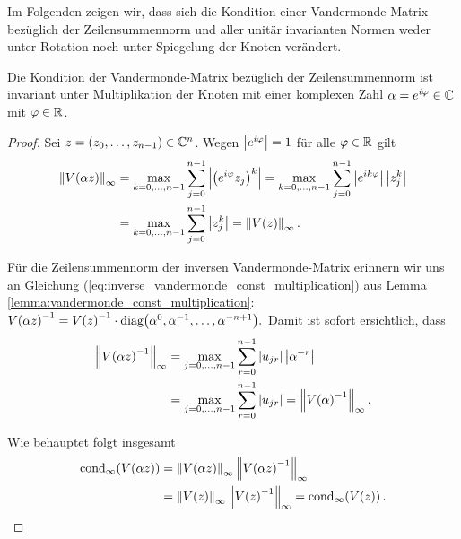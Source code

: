 Im Folgenden zeigen wir, dass sich die Kondition einer Vandermonde-Matrix
bezüglich der Zeilensummennorm und aller unitär invarianten Normen weder unter
Rotation noch unter Spiegelung der Knoten verändert.


\begin{lemma}
    \label{lemma:vandermonde_rotation_invariance}
    Die Kondition der Vandermonde-Matrix bezüglich der Zeilensummennorm ist
    invariant unter Multiplikation der Knoten mit einer komplexen Zahl
    $\alpha = e^{i\varphi} \in \mathbb{C}$ mit $\varphi \in \mathbb{R}$.
\end{lemma}
\begin{proof}
    Sei $z = (z_0, \dots, z_{n-1}) \in \mathbb{C}^n$.
    Wegen $\left\lvert e^{i\varphi} \right\rvert = 1$ für alle $\varphi \in \mathbb{R}$ gilt
    \[
        \begin{split}
            \left\lVert V \! \left( \alpha z \right) \right\rVert_\infty
            &= \max_{k=0, \dots, n-1} \sum_{j=0}^{n-1} \left\lvert \left(e^{i\varphi} z_j\right)^k \right\rvert
            = \max_{k=0, \dots, n-1} \sum_{j=0}^{n-1} \left\lvert e^{ik\varphi} \right\rvert \left\lvert z_j^k \right\rvert\\
            &= \max_{k=0, \dots, n-1} \sum_{j=0}^{n-1} \left\lvert z_j^k \right\rvert
            = \left\lVert V \! \left( z \right) \right\rVert_\infty.
        \end{split}
    \]

    \noindent Für die Zeilensummennorm der inversen Vandermonde-Matrix erinnern
    wir uns an Gleichung
    (\ref{eq:inverse_vandermonde_const_multiplication})
    aus Lemma \ref{lemma:vandermonde_const_multiplication}:
        $V \! \left( \alpha z \right)^{-1}
        = V \! \left( z \right)^{-1} \cdot \text{diag$ \left( \alpha^0, \alpha^{-1}, \dots, \alpha^{-n+1} \right)$}.$
    Damit ist sofort ersichtlich, dass
    \[
        \begin{split}
            \left\lVert V \! \left( \alpha z \right)^{-1} \right\rVert_\infty
            &= \max_{j=0, \dots, n-1} \sum_{r=0}^{n-1} \left\lvert u_{jr} \right\rvert \left\lvert \alpha^{-r} \right\rvert\\
            &= \max_{j=0, \dots, n-1} \sum_{r=0}^{n-1} \left\lvert u_{jr} \right\rvert
            = \left\lVert V \! \left( \alpha \right)^{-1} \right\rVert_\infty.
        \end{split}
    \]

    \noindent Wie behauptet folgt insgesamt
    \[
        \begin{split}
            \cond[\infty]{\Vand{\alpha z}}
            &= \norm{\Vand{\alpha z}}_\infty \norm{\Vand{\alpha z}^{-1}}_\infty\\
            &= \norm{\Vand{z}}_\infty \norm{\Vand{z}^{-1}}_\infty
            = \cond[\infty]{\Vand{z}}.
        \end{split}
    \]
\end{proof}

